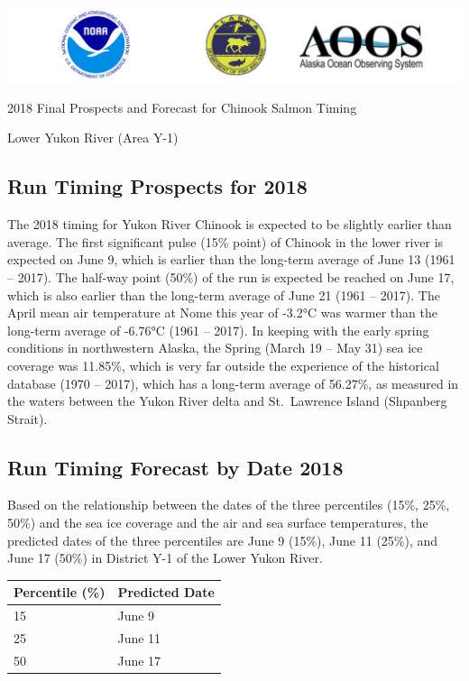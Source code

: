 \documentclass[]{article}
\title{}
\author{}
\date{}
\begin{document}
\includegraphics{images/combined.png}

\begin{center}
  \huge{2018 Final Prospects and Forecast for Chinook Salmon Timing}
  
  \large{Lower Yukon River (Area Y-1)}
\end{center}

\hypertarget{run-timing-prospects-for-2018}{%
\subsection{Run Timing Prospects for
2018}\label{run-timing-prospects-for-2018}}

The 2018 timing for Yukon River Chinook is expected to be slightly
earlier than average. The first significant pulse (15\% point) of
Chinook in the lower river is expected on June 9, which is earlier than
the long-term average of June 13 (1961 -- 2017). The half-way point
(50\%) of the run is expected be reached on June 17, which is also
earlier than the long-term average of June 21 (1961 -- 2017). The April
mean air temperature at Nome this year of -3.2°C was warmer than the
long-term average of -6.76°C (1961 -- 2017). In keeping with the early
spring conditions in northwestern Alaska, the Spring (March 19 -- May
31) sea ice coverage was 11.85\%, which is very far outside the
experience of the historical database (1970 -- 2017), which has a
long-term average of 56.27\%, as measured in the waters between the
Yukon River delta and St.~Lawrence Island (Shpanberg Strait).

\hypertarget{run-timing-forecast-by-date-2018}{%
\subsection{Run Timing Forecast by Date
2018}\label{run-timing-forecast-by-date-2018}}

Based on the relationship between the dates of the three percentiles
(15\%, 25\%, 50\%) and the sea ice coverage and the air and sea surface
temperatures, the predicted dates of the three percentiles are June 9
(15\%), June 11 (25\%), and June 17 (50\%) in District Y-1 of the Lower
Yukon River.

\begin{longtable}[]{@{}ll@{}}
\toprule
Percentile (\%) & Predicted Date\tabularnewline
\midrule
\endhead
15 & June 9\tabularnewline
25 & June 11\tabularnewline
50 & June 17\tabularnewline
\bottomrule
\end{longtable}
\end{document}
